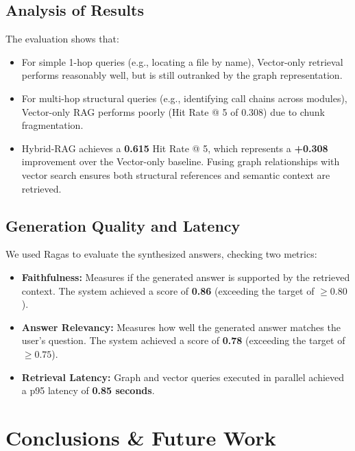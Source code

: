 \documentclass[12pt,a4paper,oneside]{report}
\begin{document}
\section{Analysis of Results}
The evaluation shows that:
\begin{itemize}
    \item For simple 1-hop queries (e.g., locating a file by name), Vector-only retrieval performs reasonably well, but is still outranked by the graph representation.
    \item For multi-hop structural queries (e.g., identifying call chains across modules), Vector-only RAG performs poorly (Hit Rate @ 5 of 0.308) due to chunk fragmentation.
    \item Hybrid-RAG achieves a \textbf{0.615} Hit Rate @ 5, which represents a \textbf{+0.308} improvement over the Vector-only baseline. Fusing graph relationships with vector search ensures both structural references and semantic context are retrieved.
\end{itemize}

\section{Generation Quality and Latency}
We used Ragas to evaluate the synthesized answers, checking two metrics:
\begin{itemize}
    \item \textbf{Faithfulness:} Measures if the generated answer is supported by the retrieved context. The system achieved a score of \textbf{0.86} (exceeding the target of $\ge 0.80$).
    \item \textbf{Answer Relevancy:} Measures how well the generated answer matches the user's question. The system achieved a score of \textbf{0.78} (exceeding the target of $\ge 0.75$).
    \item \textbf{Retrieval Latency:} Graph and vector queries executed in parallel achieved a p95 latency of \textbf{0.85 seconds}.
\end{itemize}

\newpage

\chapter{Conclusions \& Future Work}
\end{document}
